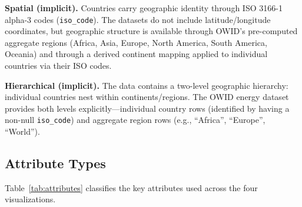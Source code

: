 \documentclass[10pt]{article}
\begin{document}
\textbf{Spatial (implicit).} Countries carry geographic identity through ISO 3166-1 alpha-3 codes (\texttt{iso\_code}). The datasets do not include latitude/longitude coordinates, but geographic structure is available through OWID's pre-computed aggregate regions (Africa, Asia, Europe, North America, South America, Oceania) and through a derived continent mapping applied to individual countries via their ISO codes.

\textbf{Hierarchical (implicit).} The data contains a two-level geographic hierarchy: individual countries nest within continents/regions. The OWID energy dataset provides both levels explicitly---individual country rows (identified by having a non-null \texttt{iso\_code}) and aggregate region rows (e.g., ``Africa'', ``Europe'', ``World'').

\subsection{Attribute Types}

Table~\ref{tab:attributes} classifies the key attributes used across the four visualizations.
\end{document}
